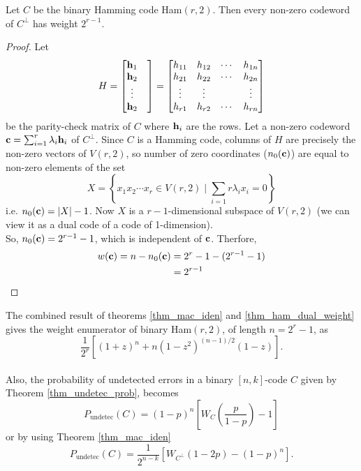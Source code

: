 \documentclass[../main.tex]{subfiles}
\begin{document}
\begin{thm}\label{thm_ham_dual_weight}
	Let $C$ be the binary Hamming code Ham$(r,2)$. Then every non-zero codeword of $C^\perp$ has weight $2^{r-1}$.
\end{thm}

\begin{proof}
	Let
	\[
		H = 
		\begin{bmatrix}
			\textbf{h}_1 & \\ 
			\textbf{h}_2 &\\ 
			\vdots &\\ 
			\textbf{h}_2 & \\
		\end{bmatrix}
		= 
		\begin{bmatrix}
			h_{11} & h_{12} & \cdots & h_{1n} \\
			h_{21} & h_{22} & \cdots & h_{2n} \\
			\vdots & \vdots & & \vdots \\
			h_{r1} & h_{r2} & \cdots & h_{rn} \\			
		\end{bmatrix}
	\]
	be the parity-check matrix of $C$ where $\textbf{h}_i$ are the rows. Let a non-zero codeword $\textbf{c} = \sum_{i=1}^{r} \lambda_i \textbf{h}_i$ of $C^\perp$. Since $C$ is a Hamming code, columns of $H$ are precisely the non-zero vectors of $V(r,2)$, so number of zero coordinates ($n_0(\textbf{c})$) are equal to non-zero elements of the set
	\[
		X = \left\{ x_1x_2\cdots x_r \in V(r,2)\; \Big | \;\sum_{i=1}{r} \lambda_i x_i = 0 \right \}
	\]
	i.e. $n_0(\textbf{c}) = |X| - 1$.
	Now $X$ is a $r-1$-dimensional subspace of $V(r,2)$ (we can view it as a dual code of a code of 1-dimension).\\
	So, $n_0(\textbf{c}) = 2^{r-1} - 1$, which is independent of $\textbf{c}$.
	Therfore, 
	\begin{align*} 
		w(\textbf{c}) = n - n_0(\textbf{c}) &= 2^r - 1 - (2^{r-1} - 1)\\
		&= 2^{r-1}
	\end{align*}
\end{proof}

The combined result of theorems \ref{thm_mac_iden} and \ref{thm_ham_dual_weight} gives the weight enumerator of binary Ham$(r,2)$, of length $n = 2^r - 1$, as
\[
	\dfrac{1}{2^r}[ (1+z)^n + n(1-z^2)^{(n-1)/2}(1-z)].
\]\\

Also, the probability of undetected errors in a binary $[n,k]$-code $C$ given by Theorem \ref{thm_undetec_prob}, becomes
\[
	P_{\text{undetec}}(C) = (1-p)^n \left[ W_C\left( \dfrac{p}{1-p} \right) - 1 \right]
\]
or by using Theorem \ref{thm_mac_iden}
\[
	P_{\text{undetec}}(C) = \dfrac{1}{2^{n-k}}[ W_{C^\perp}(1-2p) - (1-p)^n].
\]
\end{document}
